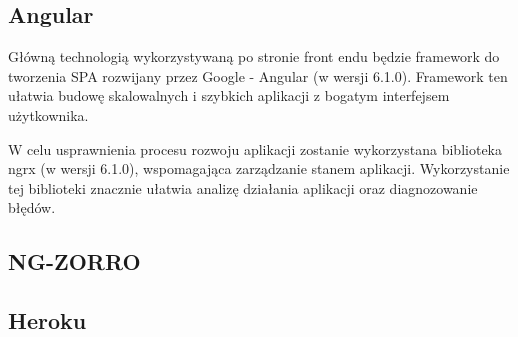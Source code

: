 \subsection{Angular}

Główną technologią wykorzystywaną po stronie front endu będzie framework do tworzenia SPA rozwijany przez Google - Angular (w wersji 6.1.0). Framework ten ułatwia budowę skalowalnych i szybkich aplikacji z bogatym interfejsem użytkownika. 

W celu usprawnienia procesu rozwoju aplikacji zostanie wykorzystana biblioteka ngrx (w wersji 6.1.0), wspomagająca zarządzanie stanem aplikacji. Wykorzystanie tej biblioteki znacznie ułatwia analizę działania aplikacji oraz diagnozowanie błędów.

\subsection{NG-ZORRO}

\subsection{Heroku}
